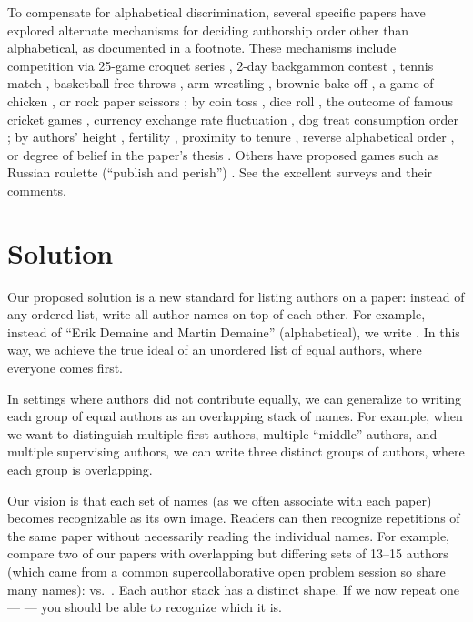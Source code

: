 \documentclass[natbib,authoryear]{sigtbd17-style}
\begin{document}
To compensate for alphabetical discrimination,
several specific papers have explored alternate mechanisms
for deciding authorship order other than alphabetical,
as documented in a footnote.
These mechanisms include competition via
25-game croquet series \cite{croquet},
2-day backgammon contest \cite{backgammon},
tennis match \cite{tennis},
basketball free throws \cite{free-throws},
arm wrestling \cite{arm-wrestling},
brownie bake-off \cite{brownie-bakeoff},
a game of chicken \cite{chicken}, or
rock paper scissors \cite{rock-paper-scissors};
by coin toss \cite{coin-toss},
dice roll \cite{dice},
the outcome of famous cricket games \cite{cricket},
currency exchange rate fluctuation \cite{currency-fluctuation},
dog treat consumption order \cite{dog};
by authors' height \cite{height},
fertility \cite{fertility},
proximity to tenure \cite{tenure-proximity},
reverse alphabetical order \cite{reverse-alphabetical},
or degree of belief in the paper's thesis \cite{belief}.
Others have proposed games such as Russian roulette
(``publish and perish'') \cite{publish-and-perish}.
See the excellent surveys \cite{survey1,survey2,survey3}
and their comments.


\section{Solution}

Our proposed solution is a new standard for listing authors on a paper:
instead of any ordered list, write all author names on top of each other.
For example, instead of ``Erik Demaine and Martin Demaine'' (alphabetical),
we write .
In this way, we achieve the true ideal of an unordered list of equal authors,
where everyone comes first.

In settings where authors did not contribute equally, we can generalize to
writing each group of equal authors as an overlapping stack of names.
For example, when we want to distinguish multiple first authors,
multiple ``middle'' authors, and multiple supervising authors,
we can write three distinct groups of authors,
where each group is overlapping.

Our vision is that each set of names (as we often associate with each paper)
becomes recognizable as its own image.  Readers can then recognize repetitions
of the same paper without necessarily reading the individual names.
For example, compare two of our papers with overlapping but differing sets
of 13--15 authors (which came from a common supercollaborative open problem
session so share many names):
\citet{ArithmeticGames_ISAAC2020} vs.\ \citet{LessThanEdgeMatching_JIP}.
Each author stack has a distinct shape.
If we now repeat one --- \citet{ArithmeticGames_ISAAC2020} ---
you should be able to recognize which it is.
\end{document}

